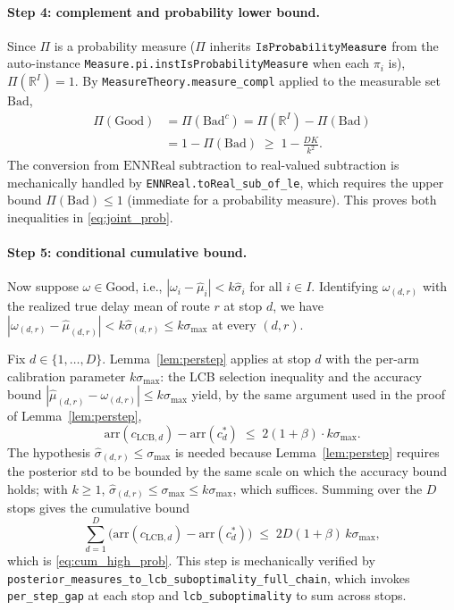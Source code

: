 \documentclass[opre,dblanonrev]{informs4}
\renewcommand{\mathtt}[1]{\mbox{\ttfamily #1}}
\begin{document}
\begin{APPENDICES}
\paragraph{Step 4: complement and probability lower bound.}
Since $\Pi$ is a probability measure ($\Pi$ inherits
$\mathtt{IsProbabilityMeasure}$ from the auto-instance
\texttt{Measure.pi.instIsProbabilityMeasure} when each $\pi_i$ is),
$\Pi(\mathbb{R}^I) = 1$. By
\texttt{MeasureTheory.measure\_compl} applied to the measurable set
$\mathrm{Bad}$,
\begin{align*}
\Pi(\mathrm{Good})
  &= \Pi(\mathrm{Bad}^c)
  = \Pi(\mathbb{R}^I) - \Pi(\mathrm{Bad}) \\
  &= 1 - \Pi(\mathrm{Bad})
  \;\geq\; 1 - \frac{DK}{k^2}.
\end{align*}
The conversion from $\mathrm{ENNReal}$ subtraction to real-valued
subtraction is mechanically handled by
\texttt{ENNReal.toReal\_sub\_of\_le}, which requires the upper
bound $\Pi(\mathrm{Bad}) \leq 1$ (immediate for a probability
measure). This proves both inequalities in \eqref{eq:joint_prob}.

\paragraph{Step 5: conditional cumulative bound.}
Now suppose $\omega \in \mathrm{Good}$, i.e., $|\omega_i - \hat\mu_i|
< k\hat\sigma_i$ for all $i \in I$. Identifying $\omega_{(d,r)}$
with the realized true delay mean of route $r$ at stop $d$, we have
$|\omega_{(d,r)} - \hat\mu_{(d,r)}| < k\hat\sigma_{(d,r)}
\leq k\sigma_{\max}$ at every $(d,r)$.

Fix $d \in \{1,\ldots,D\}$. Lemma~\ref{lem:perstep} applies at stop
$d$ with the per-arm calibration parameter $k\sigma_{\max}$: the LCB
selection inequality and the accuracy bound
$|\hat\mu_{(d,r)} - \omega_{(d,r)}| \leq k\sigma_{\max}$ yield, by
the same argument used in the proof of Lemma~\ref{lem:perstep},
\[
\mathrm{arr}(c_{\mathrm{LCB},d}) - \mathrm{arr}(c^*_d)
\;\leq\; 2(1 + \beta) \cdot k\sigma_{\max}.
\]
The hypothesis $\hat\sigma_{(d,r)} \leq \sigma_{\max}$ is needed
because Lemma~\ref{lem:perstep} requires the posterior std to be
bounded by the same scale on which the accuracy bound holds; with
$k \geq 1$, $\hat\sigma_{(d,r)} \leq \sigma_{\max} \leq k\sigma_{\max}$,
which suffices. Summing over the $D$ stops gives the cumulative bound
\[
\sum_{d=1}^{D} \bigl(\mathrm{arr}(c_{\mathrm{LCB},d})
- \mathrm{arr}(c^*_d)\bigr)
\;\leq\; 2 D (1{+}\beta)\, k\sigma_{\max},
\]
which is \eqref{eq:cum_high_prob}. This step is mechanically
verified by\linebreak
\texttt{posterior\_measures\_to\_lcb\_\allowbreak suboptimality\_\allowbreak full\_\allowbreak chain},
which invokes \texttt{per\_step\_gap} at each stop and
\texttt{lcb\_suboptimality} to sum across stops.


\end{APPENDICES}
\end{document}
